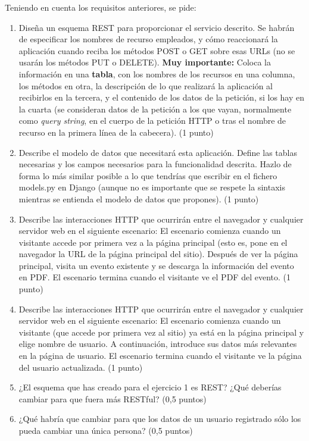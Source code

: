 Teniendo en cuenta los requisitos anteriores, se pide:

\begin{enumerate}
    \item Diseña un esquema REST para proporcionar el servicio descrito. Se habrán de especificar los nombres de recurso empleados, y cómo reaccionará la aplicación cuando reciba los métodos POST o GET sobre esas URLs (no se usarán los métodos PUT o DELETE). \textbf{Muy importante:} Coloca la información en una \textbf{tabla}, con los nombres de los recursos en una columna, los métodos en otra, la descripción de lo que realizará la aplicación al recibirlos en la tercera, y el contenido de los datos de la petición, si los hay en la cuarta (se consideran datos de la petición a los que vayan, normalmente como \emph{query string}, en el cuerpo de la petición HTTP o tras el nombre de recurso en la primera línea de la cabecera). (1 punto)

    \item Describe el modelo de datos que necesitará esta aplicación. Define las tablas necesarias y los campos necesarios para la funcionalidad descrita. Hazlo de forma lo más similar posible a lo que tendrías que escribir en el fichero models.py en Django (aunque no es importante que se respete la sintaxis mientras se entienda el modelo de datos que propones). (1 punto)

    \item Describe las interacciones HTTP que ocurrirán entre el navegador y cualquier servidor web en el siguiente escenario: El escenario comienza cuando un visitante accede por primera vez a la página principal (esto es, pone en el navegador la URL de la página principal del sitio). Después de ver la página principal, visita un evento existente y se descarga la información del evento en PDF. El escenario termina cuando el visitante ve el PDF del evento. (1 punto)

    \item Describe las interacciones HTTP que ocurrirán entre el navegador y cualquier servidor web en el siguiente escenario: El escenario comienza cuando un visitante (que accede por primera vez al sitio) ya está en la página principal y elige nombre de usuario. A continuación, introduce sus datos más relevantes en la página de usuario. El escenario termina cuando el visitante ve la página del usuario actualizada. (1 punto)

    \item  ¿El esquema que has creado para el ejercicio 1 es REST? ¿Qué deberías cambiar para que fuera más RESTful? (0,5 puntos)

    \item ¿Qué habría que cambiar para que los datos de un usuario registrado sólo los pueda cambiar una única persona? (0,5 puntos)

\end{enumerate}


